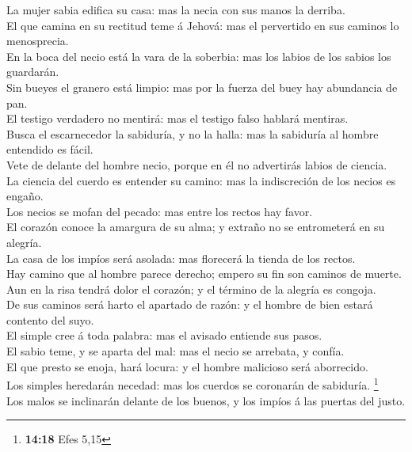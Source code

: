  La mujer sabia edifica su casa: mas la necia con sus manos
la derriba.\\
 El que camina en su rectitud teme á Jehová: mas el
pervertido en sus caminos lo menosprecia.\\
 En la boca del necio está la vara de la soberbia: mas los
labios de los sabios los guardarán.\\
 Sin bueyes el granero está limpio: mas por la fuerza del
buey hay abundancia de pan.\\
 El testigo verdadero no mentirá: mas el testigo falso
hablará mentiras.\\
 Busca el escarnecedor la sabiduría, y no la halla: mas la
sabiduría al hombre entendido es fácil.\\
 Vete de delante del hombre necio, porque en él no
advertirás labios de ciencia.\\
 La ciencia del cuerdo es entender su camino: mas la
indiscreción de los necios es engaño.\\
 Los necios se mofan del pecado: mas entre los rectos hay
favor.\\
 El corazón conoce la amargura de su alma; y extraño no se
entrometerá en su alegría.\\
 La casa de los impíos será asolada: mas florecerá la
tienda de los rectos.\\
 Hay camino que al hombre parece derecho; empero su fin son
caminos de muerte.\\
 Aun en la risa tendrá dolor el corazón; y el término de la
alegría es congoja.\\
 De sus caminos será harto el apartado de razón: y el
hombre de bien estará contento del suyo.\\
 El simple cree á toda palabra: mas el avisado entiende sus
pasos.\\
 El sabio teme, y se aparta del mal: mas el necio se
arrebata, y confía.\\
 El que presto se enoja, hará locura: y el hombre malicioso
será aborrecido.\\
 Los simples heredarán necedad: mas los cuerdos se
coronarán de sabiduría. \footnote{\textbf{14:18} Efes 5,15}\\
 Los malos se inclinarán delante de los buenos, y los
impíos á las puertas del justo.\\
